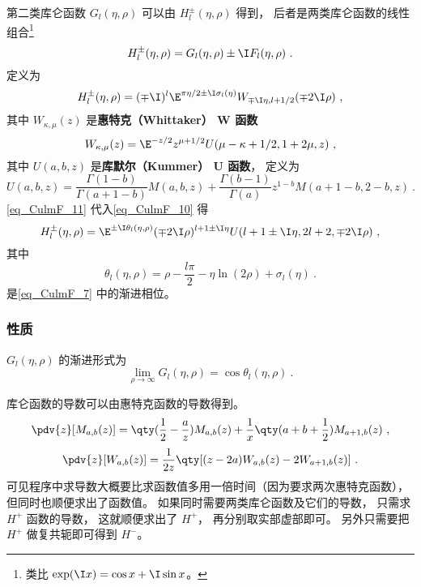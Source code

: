 第二类库仑函数 $G_l(\eta, \rho)$ 可以由 $H_l^\pm(\eta, \rho)$ 得到， 后者是两类库仑函数的线性组合\footnote{类比 $\exp(\I x) = \cos x + \I\sin x$。}
\begin{equation}
H_l^\pm(\eta, \rho) = G_l(\eta, \rho) \pm \I F_l(\eta, \rho)~.
\end{equation}	
定义为
\begin{equation}\label{eq_CulmF_10}
H_l^\pm(\eta, \rho) = (\mp\I)^l \E^{\pi\eta/2 \pm \I \sigma_l(\eta)} W_{\mp\I\eta, l + 1/2}(\mp 2\I\rho)~,
\end{equation}
其中 $W_{\kappa, \mu}(z)$ 是\textbf{惠特克（Whittaker） W 函数}
\begin{equation}\label{eq_CulmF_11}
W_{\kappa, \mu}(z) = \E^{-z/2} z^{\mu + 1/2} U(\mu - \kappa + 1/2, 1 + 2\mu, z)~,
\end{equation}
其中 $U(a, b, z)$ 是\textbf{库默尔（Kummer） U 函数}， 定义为
\begin{equation}
U(a, b, z) = \frac{\Gamma(1 - b)}{\Gamma(a + 1 - b)} M(a, b, z) + \frac{\Gamma(b - 1)}{\Gamma(a)} z^{1 - b} M(a + 1 - b, 2 - b, z)~.
\end{equation}
\autoref{eq_CulmF_11} 代入\autoref{eq_CulmF_10} 得
\begin{equation}
H_l^\pm(\eta, \rho) = \E^{\pm\I\theta_l(\eta, \rho)}(\mp 2\I\rho)^{l + 1 \pm\I\eta} U(l + 1 \pm \I\eta, 2l + 2, \mp2\I\rho)~,
\end{equation}
其中
\begin{equation}
\theta_l(\eta, \rho) = \rho - \frac{l\pi}{2} - \eta\ln(2\rho) + \sigma_l(\eta)~.
\end{equation}
是\autoref{eq_CulmF_7} 中的渐进相位。

\subsubsection{性质}
$G_l(\eta,\rho)$ 的渐进形式为
\begin{equation}
\lim_{\rho\to \infty} G_l(\eta, \rho) = \cos\theta_l(\eta, \rho)~.
\end{equation}

库仑函数的导数可以由惠特克函数的导数得到。
\begin{equation}
\pdv{z} [M_{a, b}(z)] = \qty(\frac12 - \frac{a}{z}) M_{a, b}(z) + \frac{1}{x} \qty(a + b + \frac12) M_{a+1, b}(z)~,
\end{equation}
\begin{equation}
\pdv{z} [W_{a, b}(z)] = \frac{1}{2z} \qty[(z - 2a) W_{a, b}(z) - 2W_{a+1, b}(z)]~.
\end{equation}
可见程序中求导数大概要比求函数值多用一倍时间（因为要求两次惠特克函数）， 但同时也顺便求出了函数值。 如果同时需要两类库仑函数及它们的导数， 只需求 $H^+$ 函数的导数， 这就顺便求出了 $H^+$， 再分别取实部虚部即可。 另外只需要把 $H^+$ 做复共轭即可得到 $H^-$。

